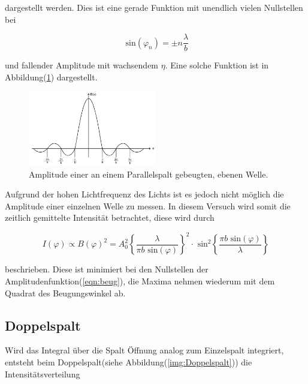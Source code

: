         \noindent dargestellt werden. Dies ist eine gerade Funktion mit unendlich vielen Nullstellen bei 

        \begin{equation*}
            \text{ sin}(\varphi_n) = \pm n \frac{\lambda}{b}
        \end{equation*}

        \noindent und fallender Amplitude mit wachsendem $\eta$. Eine solche Funktion ist in Abbildung(\ref{img:Amplitude}) dargestellt.

        \begin{figure}[ht]
            \centering
            \includegraphics[width=0.5\textwidth]{latex/images/Amplitude.PNG}
            \caption{Amplitude einer an einem Parallelspalt gebeugten, ebenen Welle\protect \cite{V406}.}
            \label{img:Amplitude}
        \end{figure}

        \noindent Aufgrund der hohen Lichtfrequenz des Lichts ist es jedoch nicht möglich die Amplitude einer einzelnen Welle zu messen. 
        In diesem Versuch wird somit die zeitlich gemittelte Intensität betrachtet, diese wird durch 

        \begin{equation}
            I(\varphi) \propto B(\varphi)^2 = A_0^2 \left\{ \frac{\lambda}{\pi b \text{ sin}(\varphi)} \right\}^2 \cdot \text{ sin}^2 
            \left\{\frac{\pi b \text{ sin}(\varphi)}{\lambda} \right\}
            \label{eqn:einzel}
        \end{equation}

        \noindent beschrieben. Diese ist minimiert bei den Nullstellen der Amplitudenfunktion(\ref{eqn:beug}), die Maxima nehmen wiederum 
        mit dem Quadrat des Beugungswinkel ab.

    \subsection{Doppelspalt}

        \noindent Wird das Integral über die Spalt Öffnung analog zum Einzelspalt integriert, entsteht beim 
        Doppelspalt(siehe Abbildung(\ref{img:Doppelspalt})) die Intensitätsverteilung

